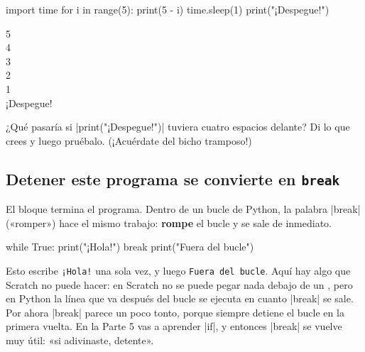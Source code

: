 \begin{tcbraster}[raster columns=2, raster equal height=rows, raster column skip=12pt, raster valign=center]
\begin{code}
import time
for i in range(5):
    print(5 - i)
    time.sleep(1)
print("¡Despegue!")
\end{code}
\begin{outputbox}
5\\
4\\
3\\
2\\
1\\
¡Despegue!
\end{outputbox}
\end{tcbraster}

\begin{think}
¿Qué pasaría si \py|print("¡Despegue!")| tuviera cuatro espacios delante? Di lo que crees y luego pruébalo. (¡Acuérdate del bicho tramposo!)
\end{think}

\subsection*{Detener este programa se convierte en \texttt{break}}

El bloque  termina el programa. Dentro de un bucle de Python, la palabra \py|break| («romper») hace el mismo trabajo: \textbf{rompe} el bucle y se sale de inmediato.

\begin{tcbraster}[raster columns=2, raster equal height=rows, raster column skip=12pt, raster valign=center]
\begin{tcolorbox}[colback=white, colframe=white, boxrule=0pt, valign=center]
\begin{scratch}[scale=0.85]
\end{scratch}
\end{tcolorbox}
\begin{code}
while True:
    print("¡Hola!")
    break
print("Fuera del bucle")
\end{code}
\end{tcbraster}

Esto escribe \texttt{¡Hola!} una sola vez, y luego \texttt{Fuera del bucle}. Aquí hay algo que Scratch no puede hacer: en Scratch no se puede pegar nada debajo de un , pero en Python la línea que va después del bucle se ejecuta en cuanto \py|break| se sale. Por ahora \py|break| parece un poco tonto, porque siempre detiene el bucle en la primera vuelta. En la Parte 5 vas a aprender \py|if|, y entonces \py|break| se vuelve muy útil: «si adivinaste, detente».

